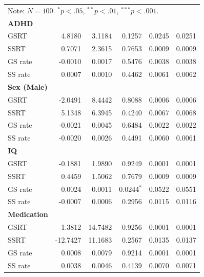 \begin{longtable}{l r r r r r}
        \bottomrule
        \multicolumn{6}{l}{\footnotesize \rule{0pt}{3ex}Note: $N=100$. $^* p<.05$, $^{**} p<.01$, $^{***} p<.001$.} \\
        \endlastfoot
        \textbf{ADHD} & & & & & \\
        \hspace{4mm} GSRT & 4.8180 & 3.1184 & 0.1257 & 0.0245 & 0.0251 \\
        \hspace{4mm} SSRT & 0.7071 & 2.3615 & 0.7653 & 0.0009 & 0.0009 \\
        \hspace{4mm} GS rate & -0.0010 & 0.0017 & 0.5476 & 0.0038 & 0.0038 \\
        \hspace{4mm} SS rate & 0.0007 & 0.0010 & 0.4462 & 0.0061 & 0.0062 \\
        \midrule
        \textbf{Sex (Male)} & & & & & \\
        \hspace{4mm} GSRT & -2.0491 & 8.4442 & 0.8088 & 0.0006 & 0.0006 \\
        \hspace{4mm} SSRT & 5.1348 & 6.3945 & 0.4240 & 0.0067 & 0.0068 \\
        \hspace{4mm} GS rate & -0.0021 & 0.0045 & 0.6484 & 0.0022 & 0.0022 \\
        \hspace{4mm} SS rate & -0.0020 & 0.0026 & 0.4491 & 0.0060 & 0.0061 \\
        \midrule
        \textbf{IQ} & & & & & \\
        \hspace{4mm} GSRT & -0.1881 & 1.9890 & 0.9249 & 0.0001 & 0.0001 \\
        \hspace{4mm} SSRT & 0.4459 & 1.5062 & 0.7679 & 0.0009 & 0.0009 \\
        \hspace{4mm} GS rate & 0.0024 & 0.0011 & 0.0244$^{*}$ & 0.0522 & 0.0551 \\
        \hspace{4mm} SS rate & -0.0007 & 0.0006 & 0.2956 & 0.0115 & 0.0116 \\
        \midrule
        \textbf{Medication} & & & & & \\
        \hspace{4mm} GSRT & -1.3812 & 14.7482 & 0.9256 & 0.0001 & 0.0001 \\
        \hspace{4mm} SSRT & -12.7427 & 11.1683 & 0.2567 & 0.0135 & 0.0137 \\
        \hspace{4mm} GS rate & 0.0008 & 0.0079 & 0.9214 & 0.0001 & 0.0001 \\
        \hspace{4mm} SS rate & 0.0038 & 0.0046 & 0.4139 & 0.0070 & 0.0071 \\
    \end{longtable}
\endgroup